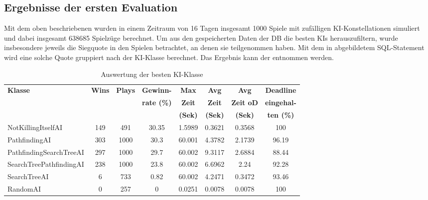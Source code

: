 \subsection{Ergebnisse der ersten Evaluation}
\label{subsec:erste-evaluation}

Mit dem oben beschriebenen  wurden in einem Zeitraum von 16 Tagen insgesamt 1000 Spiele
mit zufälligen \ac{KI}-Konstellationen simuliert und dabei insgesamt 638685 Spielzüge berechnet.
Um aus den gespeicherten Daten der \ac{DB} die besten \ac{KI}s herauszufiltern, wurde insbesondere jeweils die
Siegquote in den Spielen betrachtet, an denen sie teilgenommen haben.
Mit dem in  abgebildetem SQL-Statement wird eine solche Quote gruppiert nach der \ac{KI}-Klasse
berechnet.
Das Ergebnis kann der  entnommen werden.

\begin{table}[htb]
    \centering
    \begin{tabularx}{\textwidth}{|X|c|c|c|c|c|c|c|}
        \hline
		\textbf{Klasse} & \textbf{Wins} & \textbf{Plays} & \textbf{Gewinn-}   & \textbf{Max}   & \textbf{Avg}   & \textbf{Avg}     & \textbf{Deadline} \\
                        &               &                & \textbf{rate (\%)} & \textbf{Zeit}  & \textbf{Zeit}  & \textbf{Zeit oD} & \textbf{eingehal-} \\
                        &               &                &                    & \textbf{(Sek)} & \textbf{(Sek)} & \textbf{(Sek)}   & \textbf{ten (\%)} \\ \hline
        Not\-Killing\-Itself\-AI & 149 & 491 & 30.35 & 1.5989 & 0.3621 & 0.3568 & 100 \\ \hline
        Path\-finding\-AI & 303 & 1000 & 30.3 & 60.001 & 4.3782 & 2.1739 & 96.19 \\ \hline
		Path\-finding\-Search\-Tree\-AI & 297 & 1000 & 29.7 & 60.002 & 9.3117 & 2.6884 & 88.44 \\ \hline
		Search\-Tree\-Path\-finding\-AI & 238 & 1000 & 23.8 & 60.002 & 6.6962 & 2.24 & 92.28 \\ \hline
		Search\-Tree\-AI & 6 & 733 & 0.82 & 60.002 & 4.2471 & 0.3472 & 93.46 \\ \hline
		Random\-AI & 0 & 257 & 0 & 0.0251 & 0.0078 & 0.0078 & 100 \\ \hline
    \end{tabularx}
    \caption{Auswertung der besten \ac{KI}-Klasse}
    \label{tab:evaluation-ki-klasse}
\end{table}

